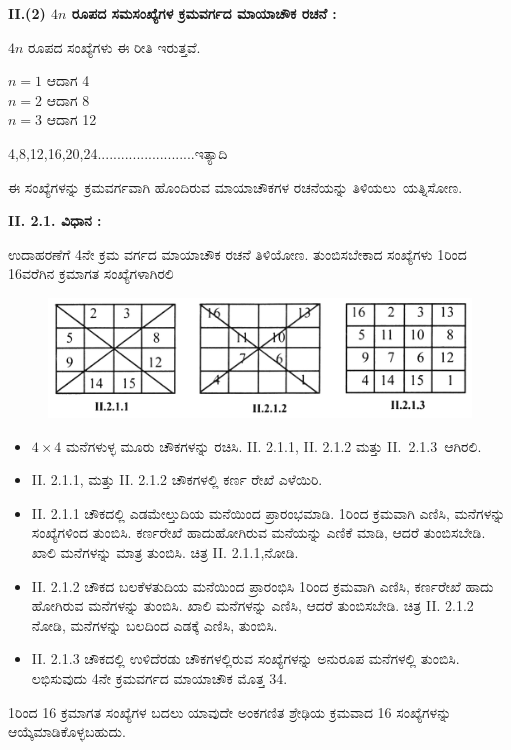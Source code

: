 \eject
\noindent \textbf{II.(2) $4n$ ರೂಪದ ಸಮಸಂಖ್ಯೆಗಳ ಕ್ರಮವರ್ಗದ ಮಾಯಾಚೌಕ ರಚನೆ :}

$4n$ ರೂಪದ ಸಂಖ್ಯೆಗಳು ಈ ರೀತಿ ಇರುತ್ತವೆ.

\begin{center}
$n=1$ ಆದಾಗ 4\\
$n=2$ ಆದಾಗ 8\\
$n=3$ ಆದಾಗ 12
\end{center}
4,8,12,16,20,24.........................ಇತ್ಯಾದಿ

ಈ ಸಂಖ್ಯೆಗಳನ್ನು ಕ್ರಮವರ್ಗವಾಗಿ ಹೊಂದಿರುವ ಮಾಯಾಚೌಕಗಳ ರಚನೆಯನ್ನು \hbox{ತಿಳಿಯಲು ಯತ್ನಿಸೋಣ.}

\noindent \textbf{II. 2.1. ವಿಧಾನ :}

ಉದಾಹರಣೆಗೆ 4ನೇ ಕ್ರಮ ವರ್ಗದ ಮಾಯಾಚೌಕ ರಚನೆ ತಿಳಿಯೋಣ. ತುಂಬಿಸ\-ಬೇಕಾದ ಸಂಖ್ಯೆಗಳು 1ರಿಂದ 16ವರೆಗಿನ ಕ್ರಮಾಗತ ಸಂಖ್ಯೆಗಳಾಗಿರಲಿ
\begin{figure}[H]
\includegraphics[scale=.9]{src/figures/chap3/fig3-16.jpg}
\end{figure}

\begin{itemize}
	\item $4 \times 4$ ಮನೆಗಳುಳ್ಳ ಮೂರು ಚೌಕಗಳನ್ನು ರಚಿಸಿ. II. 2.1.1, II. 2.1.2 ಮತ್ತು \hbox{II. 2.1.3 ಆಗಿರಲಿ.}
	\item II. 2.1.1, ಮತ್ತು II. 2.1.2 ಚೌಕಗಳಲ್ಲಿ ಕರ್ಣ ರೇಖೆ ಎಳೆಯಿರಿ.
	\item II. 2.1.1 ಚೌಕದಲ್ಲಿ ಎಡಮೇಲ್ತುದಿಯ ಮನೆಯಿಂದ ಪ್ರಾರಂಭಮಾಡಿ. 1ರಿಂದ ಕ್ರಮ\-ವಾಗಿ ಎಣಿಸಿ, ಮನೆಗಳನ್ನು ಸಂಖ್ಯೆಗಳಿಂದ ತುಂಬಿಸಿ. ಕರ್ಣರೇಖೆ ಹಾದು\-ಹೋಗಿರುವ ಮನೆಯನ್ನು ಎಣಿಕೆ ಮಾಡಿ, ಆದರೆ ತುಂಬಿಸಬೇಡಿ. ಖಾಲಿ ಮನೆಗಳನ್ನು ಮಾತ್ರ ತುಂಬಿಸಿ. ಚಿತ್ರ II. 2.1.1,ನೋಡಿ.
	\item II. 2.1.2 ಚೌಕದ ಬಲಕೆಳತುದಿಯ ಮನೆಯಿಂದ ಪ್ರಾರಂಭಿಸಿ 1ರಿಂದ ಕ್ರಮವಾಗಿ ಎಣಿಸಿ, ಕರ್ಣರೇಖೆ ಹಾದು ಹೋಗಿರುವ ಮನೆಗಳನ್ನು ತುಂಬಿಸಿ. ಖಾಲಿ ಮನೆಗಳನ್ನು ಎಣಿಸಿ, ಆದರೆ ತುಂಬಿಸಬೇಡಿ. ಚಿತ್ರ II. 2.1.2 ನೋಡಿ, ಮನೆಗಳನ್ನು ಬಲದಿಂದ ಎಡಕ್ಕೆ ಎಣಿಸಿ, ತುಂಬಿಸಿ.
	\item II. 2.1.3 ಚೌಕದಲ್ಲಿ ಉಳಿದೆರಡು ಚೌಕಗಳಲ್ಲಿರುವ ಸಂಖ್ಯೆಗಳನ್ನು ಅನುರೂಪ ಮನೆಗಳಲ್ಲಿ ತುಂಬಿಸಿ. ಲಭಿಸುವುದು 4ನೇ ಕ್ರಮವರ್ಗದ ಮಾಯಾಚೌಕ ಮೊತ್ತ 34.
\end{itemize}

1ರಿಂದ 16 ಕ್ರಮಾಗತ ಸಂಖ್ಯೆಗಳ ಬದಲು ಯಾವುದೇ ಅಂಕಗಣಿತ ಶ್ರೇಢಿಯ ಕ್ರಮವಾದ 16 ಸಂಖ್ಯೆಗಳನ್ನು ಆಯ್ಕೆಮಾಡಿಕೊಳ್ಳಬಹುದು.

